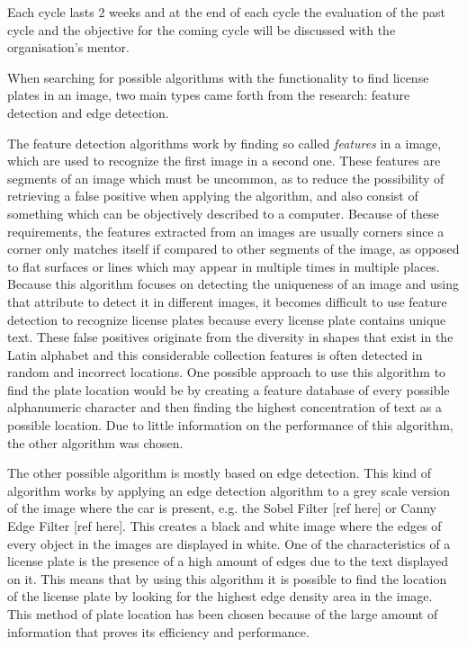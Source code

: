 Each cycle lasts 2 weeks and at the end of each cycle the evaluation of the past cycle and the objective for the coming cycle will be discussed with the organisation's mentor.



When searching for possible algorithms with the functionality to find license plates in an image, two main types came forth from the research: feature detection and edge detection. 

The feature detection algorithms work by finding so called \emph{features} in a image, which are used to recognize the first image in a second one. These features are segments of an image which must be uncommon, as to reduce the possibility of retrieving a false positive when applying the algorithm, and also consist of something which can be objectively described to a computer. Because of these requirements, the features extracted from an images are usually corners since a corner only matches itself if compared to other segments of the image, as opposed to flat surfaces or lines which may appear in multiple times in multiple places. Because this algorithm focuses on detecting the uniqueness of an image and using that attribute to detect it in different images, it becomes difficult to use feature detection to recognize license plates because every license plate contains unique text. These false positives originate from the diversity in shapes that exist in the Latin alphabet and this considerable collection features is often detected in random and incorrect locations. One possible approach to use this algorithm to find the plate location would be by creating a feature database of every possible alphanumeric character and then finding the highest concentration of text as a possible location. Due to little information on the performance of this algorithm, the other algorithm was chosen.

The other possible algorithm is mostly based on edge detection. This kind of algorithm works by applying an edge detection algorithm to a grey scale version of the image where the car is present, e.g. the Sobel Filter [ref here] or Canny Edge Filter [ref here]. This creates a black and white image where the edges of every object in the images are displayed in white. One of the characteristics of a license plate is the presence of a high amount of edges due to the text displayed on it. This means that by using this algorithm it is possible to find the location of the license plate by looking for the highest edge density area in the image. This method of plate location has been chosen because of the large amount of information that proves its efficiency and performance.

